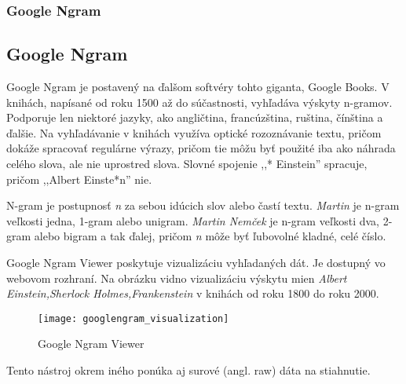 %
%
{
	\subsubsection{Google Ngram}
}
{
	\subsection{Google Ngram}
}
\label{subsubsec:googlengram}
Google Ngram je postavený na ďalšom softvéry tohto giganta, Google Books. V knihách,  napísané od roku 1500 až do súčastnosti, vyhľadáva výskyty n-gramov. Podporuje len niektoré jazyky, ako angličtina, francúzština, ruština, čínština a ďalšie. Na vyhľadávanie v knihách využíva optické rozoznávanie textu, pričom dokáže spracovať regulárne výrazy, pričom tie môžu byť použité iba ako náhrada celého slova, ale nie uprostred slova. Slovné spojenie ,,* Einstein'' spracuje, pričom ,,Albert Einste*n'' nie.

N-gram je postupnosť \textit{n} za sebou idúcich slov alebo častí textu. \textit{Martin} je n-gram veľkosti jedna, 1-gram alebo unigram. \textit{Martin Nemček} je n-gram veľkosti dva, 2-gram alebo bigram a tak ďalej, pričom \textit{n} môže byť ľubovolné kladné, celé číslo.

Google Ngram Viewer poskytuje vizualizáciu vyhľadaných dát. Je dostupný vo webovom rozhraní. Na obrázku  vidno vizualizáciu výskytu mien \textit{Albert Einstein,Sherlock Holmes,Frankenstein} v knihách od roku 1800 do roku 2000.

\begin{figure}[H]
\begin{center}\texttt{[image: googlengram\_visualization]}\end{center}
\caption[Google Ngram Viewer]{Google Ngram Viewer}\label{fig:googlengram_visualization}
\end{figure}

Tento nástroj okrem iného ponúka aj surové (angl. raw) dáta na stiahnutie.

